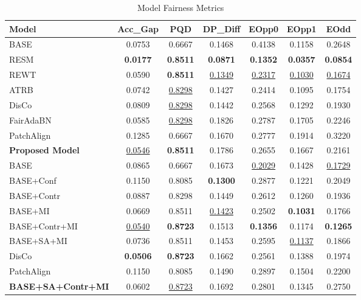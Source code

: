 


\begin{table}[h]
\centering
\caption{Model Fairness Metrics}
\label{tab:model_fairness}
\begin{tabular}{|l|c|c|c|c|c|c|}
\hline
Model & Acc\_Gap & PQD & DP\_Diff & EOpp0 & EOpp1 & EOdd \\
\hline
BASE & 0.0753 & 0.6667 & 0.1468 & 0.4138 & 0.1158 & 0.2648 \\
RESM & \textbf{0.0177} & \textbf{0.8511} & \textbf{0.0871} & \textbf{0.1352} & \textbf{0.0357} & \textbf{0.0854} \\
REWT & 0.0590 & \textbf{0.8511} & \underline{0.1349} & \underline{0.2317} & \underline{0.1030} & \underline{0.1674} \\
ATRB & 0.0742 & \underline{0.8298} & 0.1427 & 0.2414 & 0.1095 & 0.1754 \\
DisCo & 0.0809 & \underline{0.8298} & 0.1442 & 0.2568 & 0.1292 & 0.1930 \\
FairAdaBN & 0.0585 & \underline{0.8298} & 0.1826 & 0.2787 & 0.1705 & 0.2246 \\
PatchAlign & 0.1285 & 0.6667 & 0.1670 & 0.2777 & 0.1914 & 0.3220 \\
\textbf{Proposed Model} & \underline{0.0546} & \textbf{0.8511} & 0.1786 & 0.2655 & 0.1667 & 0.2161 \\
\hline
BASE & 0.0865 & 0.6667 & 0.1673 & \underline{0.2029} & 0.1428 & \underline{0.1729} \\
BASE+Conf & 0.1150 & 0.8085 & \textbf{0.1300} & 0.2877 & 0.1221 & 0.2049 \\
BASE+Contr & 0.0887 & 0.8298 & 0.1449 & 0.2612 & 0.1260 & 0.1936 \\
BASE+MI & 0.0669 & 0.8511 & \underline{0.1423} & 0.2502 & \textbf{0.1031} & 0.1766 \\
BASE+Contr+MI & \underline{0.0540} & \textbf{0.8723} & 0.1513 & \textbf{0.1356} & 0.1174 & \textbf{0.1265} \\
BASE+SA+MI & 0.0736 & 0.8511 & 0.1453 & 0.2595 & \underline{0.1137} & 0.1866 \\
DisCo & \textbf{0.0506} & \textbf{0.8723} & 0.1662 & 0.2561 & 0.1388 & 0.1974 \\
PatchAlign & 0.1150 & 0.8085 & 0.1490 & 0.2897 & 0.1504 & 0.2200 \\
\textbf{BASE+SA+Contr+MI} & 0.0602 & \underline{0.8723} & 0.1692 & 0.2801 & 0.1345 & 0.2750 \\
\hline
\end{tabular}
\end{table}


